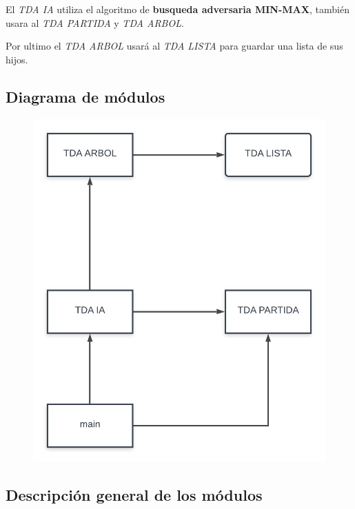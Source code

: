 \documentclass[12pt,a4paper]{article}
\begin{document}
    El {\itshape TDA IA} utiliza el algoritmo de {\bf busqueda adversaria MIN-MAX}, tambi\'en usara al {\itshape TDA PARTIDA} y {\itshape TDA ARBOL}.

    Por ultimo el {\itshape TDA ARBOL} usar\'a al {\itshape TDA LISTA} para guardar una lista de sus hijos.

\subsection{Diagrama de m\'odulos}
\begin{figure}[h!tbp]
	\centering
		\includegraphics[width=1.00\textwidth]{diagrama.jpg}
	\label{fig:diagrama}
\end{figure}

\newpage

\subsection{Descripci\'on general de los m\'odulos}
\end{document}
